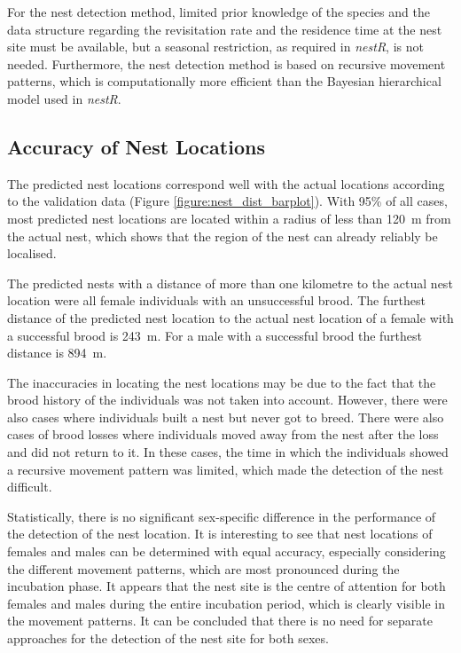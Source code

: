 For the nest detection method, limited prior knowledge of the species and the data structure regarding the revisitation rate and the residence time at the nest site must be available, but a seasonal restriction, as required in \textit{nestR}, is not needed. Furthermore, the nest detection method is based on recursive movement patterns, which is computationally more efficient than the Bayesian hierarchical model used in \textit{nestR}.



\subsection{Accuracy of Nest Locations}
The predicted nest locations correspond well with the actual locations according to the validation data (Figure \ref{figure:nest_dist_barplot}). With 95\% of all cases, most predicted nest locations are located within a radius of less than 120~m from the actual nest, which shows that the region of the nest can already reliably be localised.

The predicted nests with a distance of more than one kilometre to the actual nest location were all female individuals with an unsuccessful brood. The furthest distance of the predicted nest location to the actual nest location of a female with a successful brood is 243~m. For a male with a successful brood the furthest distance is 894~m.

The inaccuracies in locating the nest locations may be due to the fact that the brood history of the individuals was not taken into account. However, there were also cases where individuals built a nest but never got to breed. There were also cases of brood losses where individuals moved away from the nest after the loss and did not return to it. In these cases, the time in which the individuals showed a recursive movement pattern was limited, which made the detection of the nest difficult.

Statistically, there is no significant sex-specific difference in the performance of the detection of the nest location. It is interesting to see that nest locations of females and males can be determined with equal accuracy, especially considering the different movement patterns, which are most pronounced during the incubation phase. It appears that the nest site is the centre of attention for both females and males during the entire incubation period, which is clearly visible in the movement patterns. It can be concluded that there is no need for separate approaches for the detection of the nest site for both sexes.




